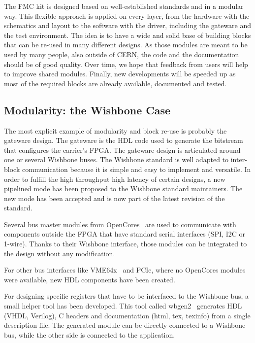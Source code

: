 \documentclass{JAC2003}
\begin{document}
The FMC kit is designed based on well-established standards and in a modular way.
This flexible approach is applied on every layer, from the hardware with the schematics and layout to the software with the driver, including the gateware and the test environment.
The idea is to have a wide and solid base of building blocks that can be re-used in many different designs.
As those modules are meant to be used by many people, also outside of CERN, the code and the documentation should be of good quality.
Over time, we hope that feedback from users will help to improve shared modules.
Finally, new developments will be speeded up as most of the required blocks are already available, documented and tested.

\subsection{Modularity: the Wishbone Case}
The most explicit example of modularity and block re-use is probably the gateware design.
The gateware is the HDL code used to generate the bitstream that configures the carrier's FPGA.
The gateware design is articulated around one or several Wishbone buses.
The Wishbone standard is well adapted to inter-block communication because it is simple and easy to implement and versatile.
In order to fulfill the high throughput high latency of certain designs, a new pipelined mode has been proposed to the Wishbone standard maintainers. The new mode has been accepted and is now part of the latest revision of the standard.

Several bus master modules from OpenCores~\cite{opencores} are used to communicate with components outside the FPGA that have standard serial interfaces (SPI, I2C or 1-wire).
Thanks to their Wishbone interface, those modules can be integrated to the design without any modification.

For other bus interfaces like VME64x~\cite{vme} and PCIe, where no OpenCores modules were available, new HDL components have been created.

For designing specific registers that have to be interfaced to the Wishbone bus, a small helper tool has been developed.
This tool called wbgen2~\cite{wbgen2} generates HDL (VHDL, Verilog), C headers and documentation (html, tex, texinfo) from a single description file.
The generated module can be directly connected to a Wishbone bus, while the other side is connected to the application.
\end{document}

